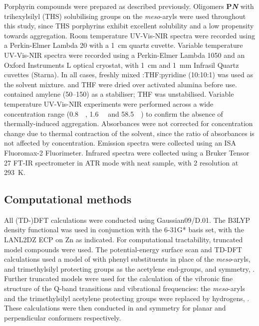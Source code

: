 		Porphyrin compounds were prepared as described previously.\autocite{Grozema2007,Tait2015} Oligomers \textbf{P\textit{N}} with trihexylsilyl (THS) solubilising groups on the \textit{meso}-aryls were used throughout this study, since THS porphyrins exhibit excellent solubility and a low propensity towards aggregation. Room temperature UV-Vis-NIR spectra were recorded using a Perkin-Elmer Lambda 20 with a \SI{1}{\centi\metre} quartz cuvette. Variable temperature UV-Vis-NIR spectra were recorded using a Perkin-Elmer Lambda 1050 and an Oxford Instruments L optical cryostat, with \SI{1}{\centi\metre} and \SI{1}{\milli\metre} Infrasil Quartz cuvettes (Starna). In all cases, freshly mixed :THF:pyridine (10:10:1) was used as the solvent mixture. \dcm and THF were dried over activated alumina before use. \dcm contained amylene (\SIrange{50}{150}{\ppm}) as a stabiliser; THF was unstabilised. Variable temperature UV-Vis-NIR experiments were performed across a wide concentration range (\SI{0.8}{\micro\Molar}, \SI{1.6}{\micro\Molar} and \SI{58.5}{\micro\Molar}) to confirm the absence of thermally-induced aggregation. Absorbances were not corrected for concentration change due to thermal contraction of the solvent, since the ratio of absorbances is not affected by concentration. Emission spectra were collected using an ISA Fluoromax-2 Fluorimeter. Infrared spectra were collected using a Bruker Tensor 27 FT-IR spectrometer in ATR mode with neat sample, with \SI{2}{\wn} resolution at \SI{293}{\kelvin}.


	\subsection{Computational methods}

		All (TD-)DFT calculations were conducted using Gaussian09/D.01.\autocite{g09} The B3LYP density functional\autocite{Becke1993} was used in conjunction with the 6-31G* basis set,\autocite{Ditchfield1971,Hehre1972,Hariharan1973,Rassolov1998} with the LANL2DZ ECP\autocite{Hay1985a,Hay1985} on Zn as indicated. For computational tractability, truncated model compounds were used. The potential-energy surface scan and TD-DFT calculations used a model of  with phenyl substituents in place of the \textit{meso}-aryls, and trimethylsilyl protecting groups as the acetylene end-groups, and  symmetry, . Further truncated models were used for the calculation of the vibronic fine structure of the Q-band transitions and vibrational frequencies: the \textit{meso}-aryls and the trimethylsilyl acetylene protecting groups were replaced by hydrogens, . These calculations were then conducted in  and  symmetry for planar and perpendicular conformers respectively.

